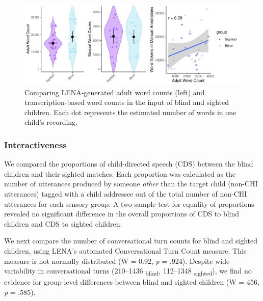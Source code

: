 \documentclass[
  man,floatsintext]{apa6}
\begin{document}
\begin{figure}
\centering
\includegraphics{input_quality_manuscript_files/figure-latex/quantity-plots-1.pdf}
\caption{\label{fig:quantity-plots}Comparing LENA-generated adult word counts (left) and transcription-based word counts in the input of blind and sighted children. Each dot represents the estimated number of words in one child's recording.}
\end{figure}

\hypertarget{interactiveness}{%
\subsubsection{Interactiveness}\label{interactiveness}}

We compared the proportions of child-directed speech (CDS) between the blind children and their sighted matches. Each proportion was calculated as the number of utterances produced by someone \emph{other} than the target child (non-CHI utterances) tagged with a child addressee out of the total number of non-CHI utterances for each sensory group. A two-sample test for equality of proportions revealed no significant difference in the overall proportions of CDS to blind children and CDS to sighted children.

We next compare the number of conversational turn counts for blind and sighted children, using LENA's automated Conversational Turn Count measure. This measure is not normally distributed (W = 0.92, \emph{p} = .924). Despite wide variability in conversational turns (210--1436 \textsubscript{blind}, 112--1348 \textsubscript{sighted}), we find no evidence for group-level differences between blind and sighted children (W = 456, \emph{p} = .585).
\end{document}
